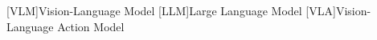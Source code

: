 \begin{acronym}[XXXXX]
    [VLM]{Vision-Language Model}
    [LLM]{Large Language Model}
    [VLA]{Vision-Language Action Model}
\end{acronym}